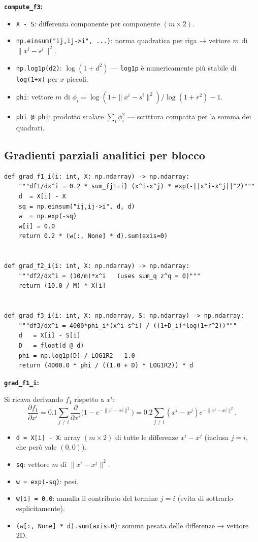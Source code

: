 \documentclass[12pt,a4paper]{article}
\theoremstyle{definition}
\begin{document}
\textbf{\texttt{compute\_f3}:}
\begin{itemize}[nosep]
  \item \texttt{X - S}: differenza componente per componente $(m \times 2)$.
  \item \texttt{np.einsum("ij,ij->i", ...)}: norma quadratica per riga → vettore $m$ di $\|x^i - s^i\|^2$.
  \item \texttt{np.log1p(d2)}: $\log(1 + d^2)$ — \texttt{log1p} è numericamente più stabile
        di \texttt{log(1+x)} per $x$ piccoli.
  \item \texttt{phi}: vettore $m$ di $\phi_i = \log(1+\|x^i-s^i\|^2)/\log(1+r^2) - 1$.
  \item \texttt{phi @ phi}: prodotto scalare $\sum_i \phi_i^2$ — scrittura compatta per la somma dei quadrati.
\end{itemize}

\subsection{Gradienti parziali analitici per blocco}

\begin{lstlisting}[caption={Righe 160–179 — Gradienti parziali di $f_1$, $f_2$, $f_3$ per il blocco $i$}]
def grad_f1_i(i: int, X: np.ndarray) -> np.ndarray:
    """df1/dx^i = 0.2 * sum_{j!=i} (x^i-x^j) * exp(-||x^i-x^j||^2)"""
    d  = X[i] - X
    sq = np.einsum("ij,ij->i", d, d)
    w  = np.exp(-sq)
    w[i] = 0.0
    return 0.2 * (w[:, None] * d).sum(axis=0)


def grad_f2_i(i: int, X: np.ndarray) -> np.ndarray:
    """df2/dx^i = (10/m)*x^i   (uses sum_q z^q = 0)"""
    return (10.0 / M) * X[i]


def grad_f3_i(i: int, X: np.ndarray, S: np.ndarray) -> np.ndarray:
    """df3/dx^i = 4000*phi_i*(x^i-s^i) / ((1+D_i)*log(1+r^2))"""
    d   = X[i] - S[i]
    D   = float(d @ d)
    phi = np.log1p(D) / LOG1R2 - 1.0
    return (4000.0 * phi / ((1.0 + D) * LOG1R2)) * d
\end{lstlisting}

\textbf{\texttt{grad\_f1\_i}:}

Si ricava derivando $f_1$ rispetto a $x^i$:
\[
  \frac{\partial f_1}{\partial x^i} = 0.1 \sum_{j \neq i} \frac{\partial}{\partial x^i}
  \bigl(1 - e^{-\|x^i - x^j\|^2}\bigr)
  = 0.2 \sum_{j \neq i} (x^i - x^j) e^{-\|x^i - x^j\|^2}.
\]
\begin{itemize}[nosep]
  \item \texttt{d = X[i] - X}: array $(m \times 2)$ di tutte le differenze $x^i - x^j$
        (inclusa $j=i$, che però vale $(0,0)$).
  \item \texttt{sq}: vettore $m$ di $\|x^i - x^j\|^2$.
  \item \texttt{w = exp(-sq)}: pesi.
  \item \texttt{w[i] = 0.0}: annulla il contributo del termine $j=i$ (evita di sottrarlo esplicitamente).
  \item \texttt{(w[:, None] * d).sum(axis=0)}: somma pesata delle differenze → vettore 2D.
\end{itemize}
\end{document}
